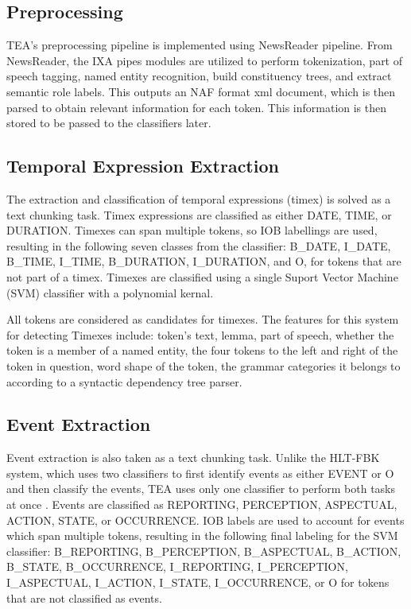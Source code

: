 \documentclass[11pt,letterpaper]{article}
\begin{document}
\subsection{Preprocessing}

TEA's preprocessing pipeline is implemented using NewsReader pipeline. From NewsReader, the IXA pipes modules are utilized to perform tokenization, part of speech tagging, named entity recognition, build constituency trees, and extract semantic role labels. This outputs an NAF format xml document, which is then parsed to obtain relevant information for each token. This information is then stored to be passed to the classifiers later.

\subsection{Temporal Expression Extraction}

The extraction and classification of temporal expressions (timex) is solved as a text chunking task. Timex expressions are classified as either DATE, TIME, or DURATION. Timexes can span multiple tokens, so IOB labellings are used, resulting in the following seven classes from the classifier: B\_DATE, I\_DATE, B\_TIME, I\_TIME, B\_DURATION, I\_DURATION, and O, for tokens that are not part of a timex. Timexes are classified using a single Suport Vector Machine (SVM) classifier with a polynomial kernal.

All tokens are considered as candidates for timexes. The features for this system for detecting Timexes include: token's text, lemma, part of speech, whether the token is a member of a named entity, the four tokens to the left and right of the token in question, word shape of the token, the grammar categories it belongs to according to a syntactic dependency tree parser.

\subsection{Event Extraction}

Event extraction is also taken as a text chunking task. Unlike the HLT-FBK system, which uses two classifiers to first identify events as either EVENT or O and then classify the events, TEA uses only one classifier to perform both tasks at once \cite{Mirza:15}. Events are classified as REPORTING, PERCEPTION, ASPECTUAL, ACTION, STATE, or OCCURRENCE. IOB labels are used to account for events which span multiple tokens, resulting in the following final labeling for the SVM classifier: B\_REPORTING, B\_PERCEPTION, B\_ASPECTUAL, B\_ACTION, B\_STATE, B\_OCCURRENCE, I\_REPORTING, I\_PERCEPTION, I\_ASPECTUAL, I\_ACTION, I\_STATE, I\_OCCURRENCE, or O for tokens that are not classified as events.
\end{document}
